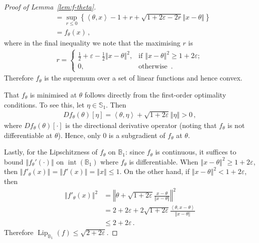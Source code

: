 \documentclass[letter, 12pt]{report}
\newcommand{\ip}[1]{\left \langle #1 \right \rangle}
\newcommand{\sphere}{\mathbb{S}}
\newcommand{\ball}{\mathbb{B}}
\newcommand{\norm}[1]{\left \Vert  #1 \right \Vert}
\newcommand{\lip}{\operatorname{Lip}}
\newcommand{\interior}{\operatorname{int}}
\newcommand{\1}{\mathbf{1}}
\renewcommand{\epsilon}{\varepsilon}
\theoremstyle{plain}
\theoremstyle{definition}
\theoremstyle{remark}
\begin{document}
\begin{proof}[Proof of Lemma~\ref{lem:f-theta}]
\begin{align}
         & = \sup_{r \leq 0} \left\{  \ip{\theta, x} - 1 + r + \sqrt{1 + 2\epsilon - 2r} \norm{x - \theta} \right\}      \label{eq:f-lower-bound} \\
         & = f_\theta(x) \,,\nonumber
    \end{align}
    where in the final inequality we note that the maximising $r$ is
    \begin{align*}
        r = \begin{cases}
                \frac{1}{2} + \epsilon - \frac{1}{2}\norm{x - \theta}^2, & \text{if } \norm{x - \theta}^2 \geq 1 + 2\epsilon; \\
                0,                                                       & \text{otherwise } \,.
            \end{cases}
    \end{align*}
    Therefore $f_\theta$ is the supremum over a set of linear functions and hence convex.

    That $f_\theta$ is minimised at $\theta$ follows directly from the first-order optimality conditions.
    To see this, let $\eta \in \sphere_1$. Then
    \begin{align*}
        Df_\theta(\theta)[\eta] = \ip{\theta, \eta} + \sqrt{1 + 2 \epsilon} \norm{\eta} > 0 \,,
    \end{align*}
    where $Df_\theta(\theta)[\cdot]$ is the directional derivative operator (noting that $f_\theta$ is not differentiable at $\theta$).
    Hence, only 0 is a subgradient of $f_\theta$ at $\theta$.

    Lastly, for the Lipschitzness of $f_\theta$ on $\ball_1$: since $f_\theta$ is continuous, it suffices to bound $\norm{f_\theta'(\cdot)}$ on $\interior(\ball_1)$ where $f_\theta$ is
    differentiable.
    When $\norm{x - \theta}^2 \geq 1 + 2 \epsilon$, then $\norm{f'_\theta(x)} = \norm{f'(x)} = \norm{x} \leq 1$.
    On the other hand, if $\norm{x - \theta}^2 < 1 + 2 \epsilon$, then
    \begin{align*}
        \norm{f'_\theta(x)}^2
         & = \norm{\theta + \sqrt{1 + 2\epsilon} \frac{x - \theta}{\norm{x - \theta}}}^2             \\
         & = 2 + 2\epsilon + 2\sqrt{1 + 2\epsilon} \frac{\ip{\theta, x - \theta}}{\norm{x - \theta}} \\
         & \leq 2 + 2\epsilon \,.
    \end{align*}
    Therefore $\lip_{\ball_1}(f) \leq \sqrt{2 + 2\epsilon}$.
\end{proof}
\end{document}

